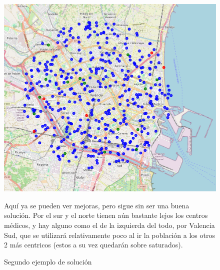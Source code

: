 \documentclass[12pt,a4paper]{book}
\begin{document}
\begin{figure}[htbp]
    \centering
    \begin{minipage}[c]{0.45\textwidth}
        \includegraphics[width=\textwidth]{images/solucion_ejemplo_2.png}
        \label{fig:ejemplo_2}
    \end{minipage}
    \hfill
    \begin{minipage}[c]{0.45\textwidth}
        Aquí ya se pueden ver mejoras, pero sigue sin ser una buena solución. Por el sur y el norte tienen aún bastante lejos los centros médicos, y hay alguno como el de la izquierda del todo, por Valencia Sud, que se utilizará relativamente poco al ir la población a los otros 2 más centricos (estos a su vez quedarán sobre saturados).
    \end{minipage}
    \caption{Segundo ejemplo de solución}
\end{figure}
\end{document}
